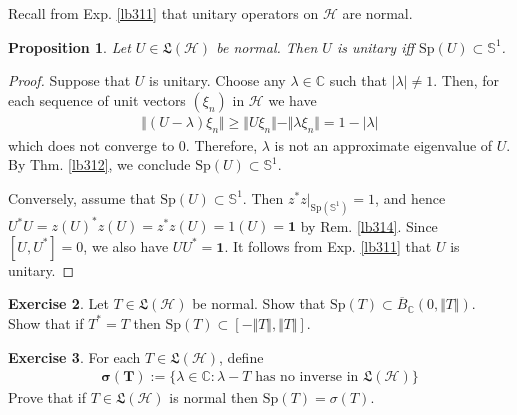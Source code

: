 \documentclass[12pt,b5paper,notitlepage]{article}
\theoremstyle{definition}
\newtheorem{df}{Definition}[subsection]
\newtheorem{exe}[df]{Exercise}
\theoremstyle{plain}
\newtheorem{pp}[df]{Proposition}
\newcommand{\fk}{\mathfrak}
\newcommand{\ovl}{\overline}
\newcommand{\idt}{\mathbf{1}}
\newcommand{\Cbb}{\mathbb C}
\newcommand{\Sp}{\mathrm{Sp}}
\newcommand{\Sbb}{{\mathbb S}}
\newcommand{\Fbb}{\mathbb F}
\newcommand{\Lin}{\mathrm{Lin}}
\newcommand{\MH}{\mathcal H}
\numberwithin{equation}{section}
\begin{document}
Recall from Exp. \ref{lb311} that unitary operators on $\MH$ are normal.

\begin{pp}\label{lb315}
Let $U\in\fk L(\MH)$ be normal. Then $U$ is unitary iff $\Sp(U)\subset\Sbb^1$.
\end{pp}

\begin{proof}
Suppose that $U$ is unitary. Choose any $\lambda\in\Cbb$ such that $|\lambda|\neq 1$. Then, for each sequence of unit vectors $(\xi_n)$ in $\MH$ we have
\begin{align*}
\Vert (U-\lambda)\xi_n\Vert\geq \Vert U\xi_n\Vert-\Vert\lambda\xi_n\Vert=1-|\lambda|
\end{align*}
which does not converge to $0$. Therefore, $\lambda$ is not an approximate eigenvalue of $U$. By Thm. \ref{lb312}, we conclude $\Sp(U)\subset\Sbb^1$.

Conversely, assume that $\Sp(U)\subset\Sbb^1$. Then $z^*z|_{\Sp(\Sbb^1)}=1$, and hence $U^*U=z(U)^*z(U)=z^*z(U)=1(U)=\idt$ by Rem. \ref{lb314}. Since $[U,U^*]=0$, we also have $UU^*=\idt$. It follows from Exp. \ref{lb311} that $U$ is unitary.
\end{proof}


\begin{exe}
Let $T\in\fk L(\MH)$ be normal. Show that $\Sp(T)\subset\ovl B_\Cbb(0,\Vert T\Vert)$. Show that if $T^*=T$ then $\Sp(T)\subset[-\Vert T\Vert,\Vert T\Vert]$.
\end{exe}

\begin{exe}
For each $T\in\fk L(\MH)$, define
\begin{align*}
\pmb{\sigma(T)}:=\{\lambda\in\Cbb:\lambda-T\text{ has no inverse in }\fk L(\MH)\}
\end{align*}
Prove that if $T\in\fk L(\MH)$ is normal then $\Sp(T)=\sigma(T)$.
\end{exe}






\begin{comment}
\begin{df}
Let $V$ is an $\Fbb$-vector space $T\in\Lin(V)$. Let $\lambda\in\Fbb$. We say that $\xi\in V$ is an \textbf{$\pmb\lambda$-eigenvector} of $T$ if $T\xi=\lambda\xi$. If there exists a non-zero $\lambda$-eigenvector of $T$, we say that $\lambda$ is an \textbf{eigenvalue} of $T$. \index{00@Eigenvalues and eigenvectors}
\end{df}
\end{comment}
\end{document}
